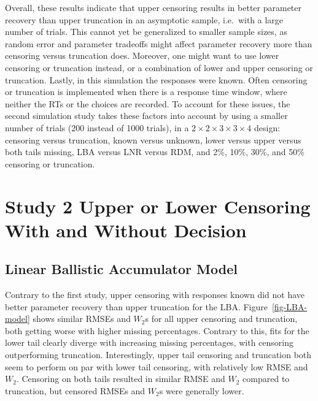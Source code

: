 \documentclass[
  stu,
  floatsintext,
  longtable,
  nolmodern,
  notxfonts,
  notimes,
  draftfirst,
  colorlinks=true,linkcolor=blue,citecolor=blue,urlcolor=blue]{apa7}
\begin{document}
Overall, these results indicate that upper censoring results in better
parameter recovery than upper truncation in an asymptotic sample,
i.e.~with a large number of trials. This cannot yet be generalized to
smaller sample sizes, as random error and parameter tradeoffs might
affect parameter recovery more than censoring versus truncation does.
Moreover, one might want to use lower censoring or truncation instead,
or a combination of lower and upper censoring or truncation. Lastly, in
this simulation the responses were known. Often censoring or truncation
is implemented when there is a response time window, where neither the
RTs or the choices are recorded. To account for these issues, the second
simulation study takes these factors into account by using a smaller
number of trials (200 instead of 1000 trials), in a
\(2 \times 2 \times 3 \times 3 \times 4\) design: censoring versus
truncation, known versus unknown, lower versus upper versus both tails
missing, LBA versus LNR versus RDM, and 2\%, 10\%, 30\%, and 50\%
censoring or truncation.

\section{Study 2 Upper or Lower Censoring With and Without
Decision}\label{study-2-upper-or-lower-censoring-with-and-without-decision}

\subsection{Linear Ballistic Accumulator
Model}\label{linear-ballistic-accumulator-model}

Contrary to the first study, upper censoring with responses known did
not have better parameter recovery than upper truncation for the LBA.
Figure~\ref{fig-LBA-model} shows similar RMSEs and \(W_2\)s for all
upper censoring and truncation, both getting worse with higher missing
percentages. Contrary to this, fits for the lower tail clearly diverge
with increasing missing percentages, with censoring outperforming
truncation. Interestingly, upper tail censoring and truncation both seem
to perform on par with lower tail censoring, with relatively low RMSE
and \(W_2\). Censoring on both tails resulted in similar RMSE and
\(W_2\) compared to truncation, but censored RMSEs and \(W_2\)s were
generally lower.
\end{document}
